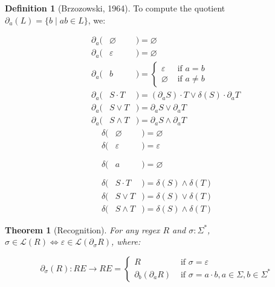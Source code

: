 \documentclass[11pt]{article}
\theoremstyle{plain}
\newtheorem{theorem}{Theorem}
\theoremstyle{definition}
\newtheorem{definition}{Definition}
\begin{document}
\begin{definition}[Brzozowski, 1964]
To compute the quotient \(\partial_a(L) = \{b \mid ab \in L\}\), we:

\vspace{-0.8cm}
\begin{multicols}{2}
\begin{eqnarray*}
\phantom{--}\partial_a(& \varnothing &) = \varnothing                                           \\
\phantom{--}\partial_a(& \varepsilon &) = \varnothing                                           \\
\phantom{--}\partial_a(& b           &) = \begin{cases}\varepsilon &\text{ if } a = b\\ \varnothing &\text{ if } a \neq b \end{cases}\\
\phantom{--}\partial_a(& S\cdot T    &) = (\partial_a S)\cdot T \vee \delta(S)\cdot\partial_a T \\
\phantom{--}\partial_a(& S\vee  T    &) = \partial_a S \vee  \partial_a T                        \\
\phantom{--}\partial_a(& S\land T    &) = \partial_a S \land \partial_a T
\end{eqnarray*} \break\vspace{-0.45cm}
\begin{eqnarray*}
\delta(& \varnothing &)= \varnothing                                      \\
\delta(& \varepsilon &)= \varepsilon                                      \\
\delta(& a           &)= \varnothing\phantom{\begin{cases}\varepsilon\\\varnothing\end{cases}}\\
\delta(& S\cdot T    &)= \delta(S) \land \delta(T)                        \\
\delta(& S\vee T     &)= \delta(S) \vee  \delta(T)                        \\
\delta(& S\land T    &)= \delta(S) \land \delta(T)
\end{eqnarray*}
\end{multicols}
\end{definition}

\begin{theorem}[Recognition]
  For any regex \(R\) and \(\sigma: \Sigma^*\), \(\sigma \in \mathcal{L}(R) \Longleftrightarrow \varepsilon \in \mathcal{L}(\partial_\sigma R)\), where:

  \[
    \partial_\sigma (R): RE \rightarrow RE = \begin{cases}R &\text{ if } \sigma = \varepsilon\\\partial_b(\partial_a R) &\text{ if } \sigma = a \cdot b, a \in \Sigma, b \in \Sigma^* \end{cases}
  \]
\end{theorem}
\end{document}
